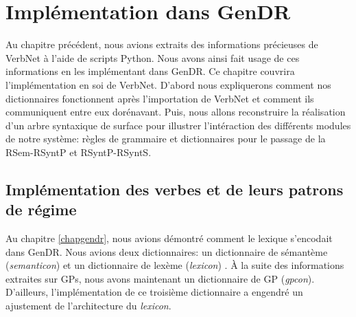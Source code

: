 
\chapter{Implémentation dans GenDR}\label{ch:implementation}

Au chapitre précédent, nous avions extraits des informations précieuses de VerbNet à l'aide de scripts Python. Nous avons ainsi fait usage de ces informations en les implémentant dans GenDR. Ce chapitre couvrira l'implémentation en soi de VerbNet. D'abord nous expliquerons comment nos dictionnaires fonctionnent après l'importation de VerbNet et comment ils communiquent entre eux dorénavant. Puis, nous allons reconstruire la réalisation d'un arbre syntaxique de surface pour illustrer l'intéraction des différents modules de notre système: règles de grammaire et dictionnaires pour le passage de la \ac{RSem}-\ac{RSyntP} et \ac{RSyntP}-\ac{RSyntS}.

\section{Implémentation des verbes et de leurs patrons de régime}

Au chapitre \ref{chapgendr}, nous avions démontré comment le lexique s'encodait dans GenDR. Nous avions deux dictionnaires: un dictionnaire de sémantème (\emph{semanticon}) et un dictionnaire de lexème (\emph{lexicon}) . À la suite des informations extraites sur \acp{GP}, nous avons maintenant un dictionnaire de \ac{GP} (\emph{gpcon}). D'ailleurs, l'implémentation de ce troisième dictionnaire a engendré un ajustement de l'architecture du \emph{lexicon}.

